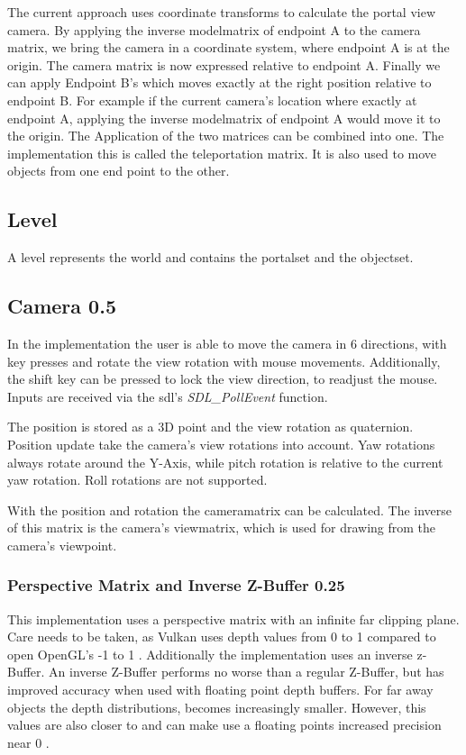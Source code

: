 The current approach uses coordinate transforms to calculate the portal view camera. By applying the inverse modelmatrix of endpoint A to the camera matrix, we bring the camera in a coordinate system, where endpoint A is at the origin. The camera matrix is now expressed relative to endpoint A. Finally we can apply Endpoint B's which moves exactly at the right position relative to endpoint B.
For example if the current camera's location where exactly at endpoint A, applying the inverse modelmatrix of endpoint A would move it to the origin.
The Application of the two matrices can be combined into one. The implementation this is called the teleportation matrix. It is also used to move objects from one end point to the other.  






\subsection{Level}
A level represents the world and contains the \gls{portalset} and the \gls{objectset}.



\subsection{Camera 0.5}
In the implementation the user is able to move the camera in 6 directions, with key presses and rotate the view rotation with mouse movements. Additionally, the shift key can be pressed to lock the view direction, to readjust the mouse. Inputs are received via the \gls{sdl}'s \cite{sdl} \textit{SDL\_PollEvent} function.

The position is stored as a 3D point and the view rotation as quaternion. Position update take the camera's view rotations into account. Yaw rotations always rotate around the Y-Axis, while pitch rotation is relative to the current yaw rotation. Roll rotations are not supported.

With the position and rotation the \gls{cameramatrix} can be calculated. The inverse of this matrix is the camera's \gls{viewmatrix}, which is used for drawing from the camera's viewpoint.

\subsubsection{Perspective Matrix and Inverse Z-Buffer 0.25}
This implementation uses a perspective matrix with an infinite far clipping plane. Care needs to be taken, as Vulkan uses depth values from 0 to 1 \cite{khronos:vulkan:spec1.1} compared to open OpenGL's -1 to 1 \cite{khronos:openGL:spec4.6}. Additionally the implementation uses an inverse z-Buffer. An inverse Z-Buffer performs no worse than a regular Z-Buffer, but has improved accuracy when used with floating point depth buffers. For far away objects the depth distributions, becomes increasingly smaller. However, this values are also closer to and can make use a floating points increased precision near 0 \cite{lapidous:1999:optimal, nvidia:inversez}.


